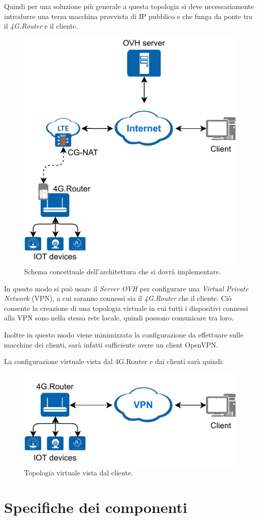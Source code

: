 Quindi per una soluzione più generale a questa topologia si deve necessariamente introdurre una terza macchina provvista di IP pubblico e che funga da ponte tra il \textit{4G.Router} e il cliente.


\begin{figure}[H]
	\centering
	\includegraphics[width=0.5\linewidth]{immagini/diag-real}
	\caption{Schema concettuale dell'architettura che si dovrà implementare.}
	\label{fig:schem_architettura_reale}
\end{figure}

In questo modo si può usare il \textit{Server OVH} per configurare una \textit{Virtual Private Network} (VPN), a cui saranno connessi sia il \textit{4G.Router} che il cliente. Ciò consente la creazione di una topologia virtuale in cui tutti i dispositivi connessi alla VPN sono nella stessa rete locale, quindi possono comunicare tra loro.

Inoltre in questo modo viene minimizzata la configurazione da effettuare sulle macchine dei clienti, sarà infatti sufficiente avere un client OpenVPN.

La configurazione virtuale vista dal 4G.Router e dai clienti sarà quindi:

\begin{figure}[H]
	\centering
	\includegraphics[width=0.5\linewidth]{immagini/diag-virtual}
	\caption{Topologia virtuale vista dal cliente.}
	\label{fig:schema_architettura_virtuale}
\end{figure}


\section{Specifiche dei componenti}

